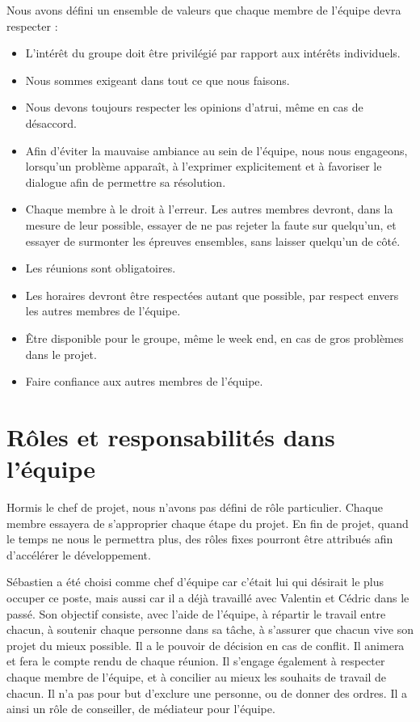\documentclass[11pt]{article}
\begin{document}
Nous avons défini un ensemble de valeurs que chaque membre de l'équipe devra respecter :
\begin{itemize}
\item L'intérêt du groupe doit être privilégié par rapport aux intérêts individuels. 
\item Nous sommes exigeant dans tout ce que nous faisons.
\item Nous devons toujours respecter les opinions d'atrui, même en cas de désaccord.
\item Afin d'éviter la mauvaise ambiance au sein de l'équipe, nous nous engageons, lorsqu'un problème apparaît, à l'exprimer explicitement et à favoriser le dialogue afin de permettre sa résolution.
\item Chaque membre à le droit à l'erreur. Les autres membres devront, dans la mesure de leur possible, essayer de ne pas rejeter la faute sur quelqu'un, et essayer de surmonter les épreuves ensembles, sans laisser quelqu'un de côté.
\item Les réunions sont obligatoires.
\item Les horaires devront être respectées autant que possible, par respect envers les autres membres de l'équipe.
\item Être disponible pour le groupe, même le week end, en cas de gros problèmes dans le projet.
\item Faire confiance aux autres membres de l'équipe.
\end{itemize}

\section{Rôles et responsabilités dans l'équipe}
Hormis le chef de projet, nous n'avons pas défini de rôle particulier. Chaque membre essayera de s'approprier chaque étape du projet. En fin de projet, quand le temps ne nous le permettra plus, des rôles fixes pourront être attribués afin d'accélérer le développement.

Sébastien a été choisi comme chef d'équipe car c'était lui qui désirait le plus occuper ce poste, mais aussi car il a déjà travaillé avec Valentin et Cédric dans le passé. Son objectif consiste, avec l'aide de l'équipe, à répartir le travail entre chacun, à soutenir chaque personne dans sa tâche, à s'assurer que chacun vive son projet du mieux possible. Il a le pouvoir de décision en cas de conflit. Il animera et fera le compte rendu de chaque réunion. Il s'engage également à respecter chaque membre de l'équipe, et à concilier au mieux les souhaits de travail de chacun. Il n'a pas pour but d'exclure une personne, ou de donner des ordres. Il a ainsi un rôle de conseiller, de médiateur pour l'équipe.
\end{document}
